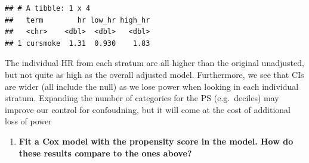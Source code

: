 \documentclass[
]{book}
\newenvironment{Shaded}{\begin{snugshade}}{\end{snugshade}}
\newcommand{\DataTypeTok}[1]{\textcolor[rgb]{0.13,0.29,0.53}{#1}}
\newcommand{\FloatTok}[1]{\textcolor[rgb]{0.00,0.00,0.81}{#1}}
\newcommand{\KeywordTok}[1]{\textcolor[rgb]{0.13,0.29,0.53}{\textbf{#1}}}
\newcommand{\NormalTok}[1]{#1}
\newcommand{\OperatorTok}[1]{\textcolor[rgb]{0.81,0.36,0.00}{\textbf{#1}}}
\newcommand{\StringTok}[1]{\textcolor[rgb]{0.31,0.60,0.02}{#1}}
\providecommand{\tightlist}{%
  \setlength{\itemsep}{0pt}\setlength{\parskip}{0pt}}
\begin{document}
\begin{Shaded}
\end{Shaded}

\begin{verbatim}
## # A tibble: 1 x 4
##   term        hr low_hr high_hr
##   <chr>    <dbl>  <dbl>   <dbl>
## 1 cursmoke  1.31  0.930    1.83
\end{verbatim}

The individual HR from each stratum are all higher than the original unadjusted, but not quite as high as the overall adjusted model. Furthermore, we see that CIs are wider (all include the null) as we lose power when looking in each individual stratum. Expanding the number of categories for the PS (e.g.~deciles) may improve our control for confoudning, but it will come at the cost of additional loss of power

\begin{enumerate}
\def\labelenumi{\arabic{enumi}.}
\setcounter{enumi}{1}
\tightlist
\item
  \textbf{Fit a Cox model with the propensity score in the model. How do these results compare to the ones above?}
\end{enumerate}
\end{document}
